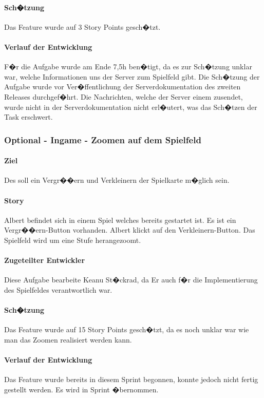 \documentclass[12pt, titlepage]{scrartcl}
\newcommand{\RN}[1]{%
	\textup{\uppercase\expandafter{\romannumeral#1}}%
}
\begin{document}
		\paragraph{Sch�tzung}
		Das Feature wurde auf 3 Story Points gesch�tzt.
		\paragraph{Verlauf der Entwicklung} 
		F�r die Aufgabe wurde am Ende 7,5h ben�tigt, da es zur Sch�tzung unklar war, welche Informationen uns der Server zum Spielfeld gibt. Die Sch�tzung der Aufgabe wurde vor Ver�ffentlichung der Serverdokumentation des zweiten Releases durchgef�hrt. Die Nachrichten, welche der Server einem zusendet, wurde nicht in der Serverdokumentation nicht erl�utert, was das Sch�tzen der Task erschwert.
		
		\subsubsection{Optional - Ingame - Zoomen auf dem Spielfeld}
		\paragraph{Ziel} Des soll ein Vergr��ern und Verkleinern der Spielkarte m�glich sein.
		\paragraph{Story}Albert befindet sich in einem Spiel welches bereits gestartet ist. Es ist ein \glqq Vergr��ern\grqq-Button vorhanden. Albert klickt auf den  \glqq Verkleinern\grqq-Button. Das Spielfeld wird um eine Stufe herangezoomt.
		\paragraph{Zugeteilter Entwickler} Diese Aufgabe bearbeite Keanu St�ckrad, da Er auch f�r die Implementierung des Spielfeldes verantwortlich war.
		\paragraph{Sch�tzung}
		Das Feature wurde auf 15 Story Points gesch�tzt, da es noch unklar war wie man das Zoomen realisiert werden kann.
		\paragraph{Verlauf der Entwicklung} 
		Das Feature wurde bereits in diesem Sprint begonnen, konnte jedoch nicht fertig gestellt werden. Es wird in Sprint \RN{4} �bernommen.
		
\end{document}
